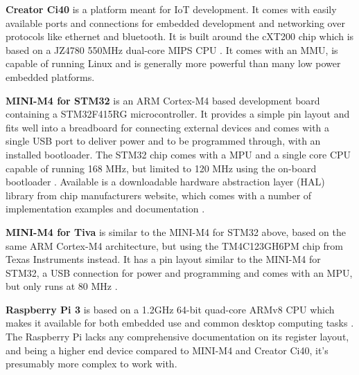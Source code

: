 \textbf{Creator Ci40} is a platform meant for IoT development.
It comes with easily available ports and connections for embedded development
and networking over protocols like ethernet and bluetooth.
It is built around the cXT200 chip which is based on a JZ4780 550MHz dual-core MIPS CPU \cite{creator_ci40_specs}.
It comes with an MMU, is capable of running Linux
and is generally more powerful than many low power embedded platforms.

\textbf{MINI-M4 for STM32} is an ARM Cortex-M4 based development board containing a STM32F415RG microcontroller.
It provides a simple pin layout and fits well into a breadboard for connecting external devices
and comes with a single USB port to deliver power and to be programmed through, with an installed bootloader.
The STM32 chip comes with a MPU and a single core CPU capable of running 168 MHz,
but limited to 120 MHz using the on-board bootloader \cite{MINI-M4_stm32_specs}.
Available is a downloadable hardware abstraction layer (HAL) library from chip manufacturers website,
which comes with a number of implementation examples and documentation \cite{HAL_library}.

\textbf{MINI-M4 for Tiva} is similar to the MINI-M4 for STM32 above,
based on the same ARM Cortex-M4 architecture,
but using the TM4C123GH6PM chip from Texas Instruments instead.
It has a pin layout similar to the MINI-M4 for STM32,
a USB connection for power and programming and comes with an MPU,
but only runs at 80 MHz \cite{MINI-M4_tiva_specs}.

\textbf{Raspberry Pi 3} is
based on a 1.2GHz 64-bit quad-core ARMv8 CPU which
makes it available for both embedded use and common desktop computing tasks \cite{raspberry_specs}.
The Raspberry Pi lacks any comprehensive documentation on its register layout,
and being a higher end device compared to MINI-M4 and Creator Ci40,
it's presumably more complex to work with.

